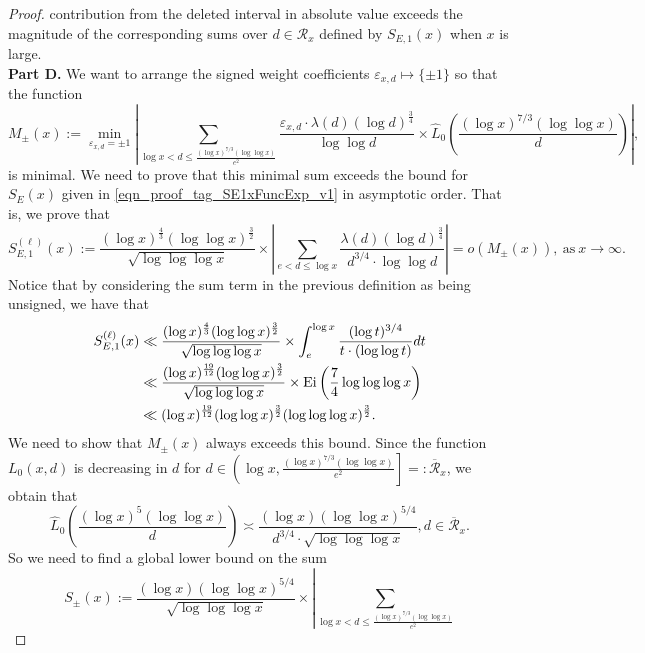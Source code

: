 \documentclass[11pt,reqno,a4letter]{article}
\numberwithin{figure}{section}
\numberwithin{table}{section}
\theoremstyle{plain}
\numberwithin{theorem}{section}
\theoremstyle{definition}
\begin{document}
\begin{proof}
contribution from the deleted interval in absolute value exceeds the magnitude of the 
corresponding sums over $d \in \mathcal{R}_x$ defined by 
$S_{E,1}(x)$ when $x$ is large. \\ 
\textbf{Part D.} 
We want to arrange the signed weight coefficients $\varepsilon_{x,d} \mapsto \{\pm 1\}$ 
so that the function 
\[
M_{\pm}(x) := \min\limits_{\varepsilon_{x,d} = \pm 1} 
     \left\lvert \sum_{\log x < d \leq \frac{(\log x)^{7/3} (\log\log x)}{e^2}} 
     \frac{\varepsilon_{x,d} \cdot 
     \lambda(d) (\log d)^{\frac{3}{4}}}{\log\log d} \times 
     \widehat{L}_0\left(\frac{(\log x)^{7/3} (\log\log x)}{d}\right) \right\rvert, 
\]
is minimal. We need to prove that this minimal sum exceeds the bound 
for $S_E(x)$ given in \eqref{eqn_proof_tag_SE1xFuncExp_v1} in asymptotic order. 
That is, we prove that 
\[
S_{E,1}^{(\ell)}(x) := 
     \frac{(\log x)^{\frac{4}{3}} (\log\log x)^{\frac{3}{2}}}{ 
     \sqrt{\log\log\log x}} \times 
     \left\lvert \sum_{e < d \leq \log x} 
     \frac{\lambda(d) (\log d)^{\frac{3}{4}}}{d^{3/4} \cdot \log\log d} 
     \right\rvert = o\left(M_{\pm}(x)\right), \mathrm{\ as\ } x \rightarrow \infty. 
\] 
Notice that by considering the sum term in the previous definition as being unsigned, 
we have that 
\begin{align} 
\notag 
S_{E,1}^{(\ell)}(x) & \ll \frac{(\log x)^{\frac{4}{3}} (\log\log x)^{\frac{3}{2}}}{ 
     \sqrt{\log\log\log x}} \times \int_e^{\log x} \frac{(\log t)^{3/4}}{t \cdot (\log\log t)} dt \\ 
\notag 
     & \ll \frac{(\log x)^{\frac{19}{12}} (\log\log x)^{\frac{3}{2}}}{ 
     \sqrt{\log\log\log x}} \times \operatorname{Ei}\left(\frac{7}{4} \log\log\log x\right) \\ 
\label{eqn_proof_tag_SE1Ellx_BoundFunc_MaximalOrder_v1} 
     & \ll (\log x)^{\frac{19}{12}} (\log\log x)^{\frac{3}{2}} (\log\log\log x)^{\frac{3}{2}}. 
\end{align} 
We need to show that $M_{\pm}(x)$ always exceeds this bound. 
Since the function $L_0(x, d)$ is decreasing in $d$ for 
$d \in \left(\log x, \frac{(\log x)^{7/3} (\log\log x)}{e^2}\right] =: \overline{\mathcal{R}}_x$, 
we obtain that 
\[
\widehat{L}_0\left(\frac{(\log x)^{5} (\log\log x)}{d}\right) \asymp
     \frac{(\log x) (\log\log x)^{5/4}}{d^{3/4} \cdot \sqrt{\log\log\log x}}, 
     d \in \overline{\mathcal{R}}_x. 
\]
So we need to find a global lower bound on the sum 
\[
S_{\pm}(x) := 
     \frac{(\log x) (\log\log x)^{5/4}}{\sqrt{\log\log\log x}} \times 
     \left\lvert \sum_{\log x < d \leq \frac{(\log x)^{7/3} (\log\log x)}{e^2}} 
\]
\end{proof}
\end{document}
